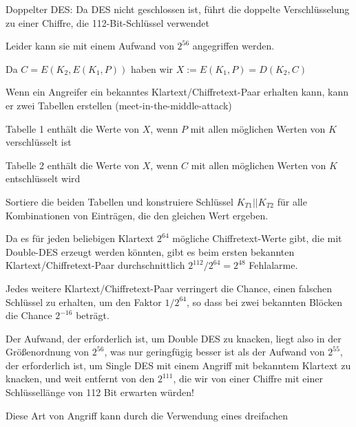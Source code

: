 \documentclass[a4paper]{article}
\begin{document}
\begin{multicols}{3}
      \begin{itemize*}
            \item Doppelter DES: Da DES nicht geschlossen ist, führt die doppelte
            Verschlüsselung zu einer Chiffre, die 112-Bit-Schlüssel verwendet
            \begin{itemize*}
                  \item Leider kann sie mit einem Aufwand von $2^{56}$ angegriffen werden.
                  \item Da $C=E(K_2,E(K_1,P))$ haben wir $X:=E(K_1,P)=D(K_2,C)$
                  \item Wenn ein Angreifer ein bekanntes Klartext/Chiffretext-Paar erhalten kann, kann er zwei Tabellen erstellen (meet-in-the-middle-attack)
                  \begin{itemize*} \item Tabelle 1 enthält die Werte von $X$, wenn $P$ mit allen möglichen Werten von $K$ verschlüsselt ist \item Tabelle 2 enthält die Werte von $X$, wenn $C$ mit allen möglichen Werten von $K$ entschlüsselt wird \item Sortiere die beiden Tabellen und konstruiere Schlüssel $K_{T1}|| K_{T2}$ für alle Kombinationen von Einträgen, die den gleichen Wert ergeben. \end{itemize*}
            \end{itemize*}
            \item Da es für jeden beliebigen Klartext $2^{64}$ mögliche
            Chiffretext-Werte gibt, die mit Double-DES erzeugt werden könnten,
            gibt es beim ersten bekannten Klartext/Chiffretext-Paar
            durchschnittlich $2^{112}/2^{64}=2^{48}$ Fehlalarme.
            \item Jedes weitere Klartext/Chiffretext-Paar verringert die Chance, einen
            falschen Schlüssel zu erhalten, um den Faktor $1/2^{64}$, so
            dass bei zwei bekannten Blöcken die Chance $2^{-16}$ beträgt.
            \item Der Aufwand, der erforderlich ist, um Double DES zu knacken, liegt
            also in der Größenordnung von $2^{56}$, was nur geringfügig
            besser ist als der Aufwand von $2^{55}$, der erforderlich ist,
            um Single DES mit einem Angriff mit bekanntem Klartext zu knacken, und
            weit entfernt von den $2^{111}$, die wir von einer Chiffre mit
            einer Schlüssellänge von 112 Bit erwarten würden!
            \item Diese Art von Angriff kann durch die Verwendung eines dreifachen

\end{itemize*}
\end{multicols}
\end{document}
